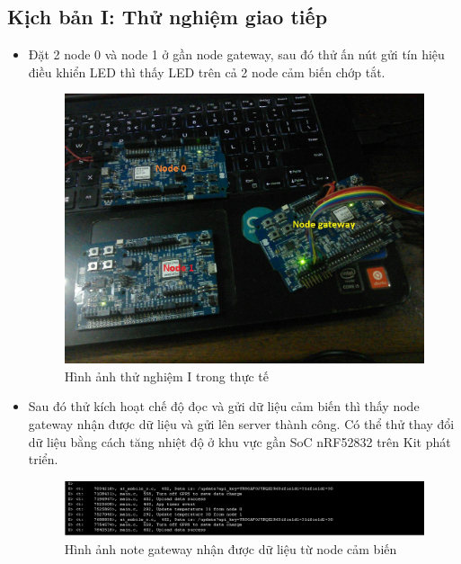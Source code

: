         \subsection{Kịch bản I: Thử nghiệm giao tiếp}
        \begin{itemize}
            \item Đặt 2 node 0 và node 1 ở gần node gateway, sau đó thử ấn nút gửi tín hiệu điều khiển LED thì thấy LED trên cả 2 node cảm biến chớp tắt.
            \begin{figure}[h!]
	    	 \begin{center}
	    		\includegraphics[scale=0.4]{images/ex1-1.jpg}
	    		\caption{Hình ảnh thử nghiệm I trong thực tế}
	    	\end{center}
    	\end{figure}
            \item Sau đó thử kích hoạt chế độ đọc và gửi dữ liệu cảm biến thì thấy node gateway nhận được dữ liệu và gửi lên server thành công. Có thể thử thay đổi dữ liệu bằng cách tăng nhiệt độ ở khu vực gần SoC nRF52832 trên Kit phát triển.
            \begin{figure}[h!]
	    	 \begin{center}
	    		\includegraphics[scale=0.4]{images/ex1-2.png}
	    		\caption{Hình ảnh note gateway nhận được dữ liệu từ node cảm biến}
	    	\end{center}

\end{figure}
\end{itemize}
